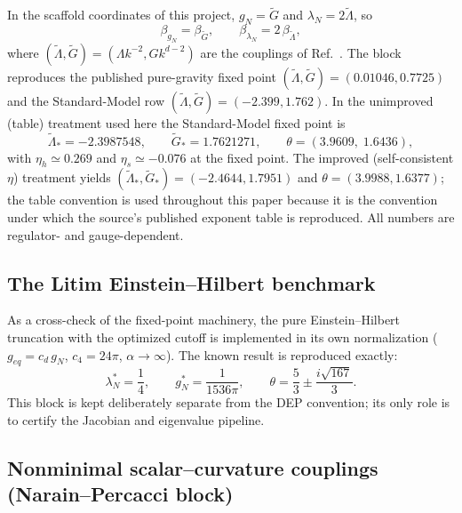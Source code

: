 \documentclass[11pt]{article}
\newcommand{\Lt}{\tilde\Lambda}
\newcommand{\Gt}{\tilde G}
\begin{document}
In the scaffold coordinates of this project, $g_N=\Gt$ and
$\lambda_N=2\Lt$, so
\begin{equation}
  \label{eq:scaffold}
  \beta_{g_N}=\beta_{\Gt},\qquad
  \beta_{\lambda_N}=2\,\beta_{\Lt},
\end{equation}
where $(\Lt,\Gt)=(\Lambda k^{-2}, G k^{d-2})$ are the couplings of
Ref.~\cite{dep14}.  The block reproduces the published pure-gravity fixed
point $(\Lt,\Gt)=(0.01046,0.7725)$ and the Standard-Model row
$(\Lt,\Gt)=(-2.399,1.762)$.  In the unimproved (table) treatment used here the
Standard-Model fixed point is
\begin{equation}
  \label{eq:depfp}
  \Lt_*=-2.3987548,\qquad \Gt_*=1.7621271,\qquad
  \theta=(3.9609,\;1.6436),
\end{equation}
with $\eta_h\simeq 0.269$ and $\eta_s\simeq -0.076$ at the fixed point.  The
improved (self-consistent $\eta$) treatment yields
$(\Lt_*,\Gt_*)=(-2.4644,1.7951)$ and $\theta=(3.9988,1.6377)$; the table
convention is used throughout this paper because it is the convention under
which the source's published exponent table is reproduced.  All numbers are
regulator- and gauge-dependent.

\subsection{The Litim Einstein--Hilbert benchmark}
\label{sec:litim}

As a cross-check of the fixed-point machinery, the pure Einstein--Hilbert
truncation with the optimized cutoff \cite{litim01,litim06} is implemented in
its own normalization ($g_{eq}=c_d\,g_N$, $c_4=24\pi$, $\alpha\to\infty$).
The known result is reproduced exactly:
\begin{equation}
  \label{eq:litimfp}
  \lambda_N^*=\frac14,\qquad g_N^*=\frac{1}{1536\pi},\qquad
  \theta=\frac53\pm \frac{i\sqrt{167}}{3}.
\end{equation}
This block is kept deliberately separate from the DEP convention; its only
role is to certify the Jacobian and eigenvalue pipeline.

\subsection{Nonminimal scalar--curvature couplings (Narain--Percacci block)}
\label{sec:np}
\end{document}
